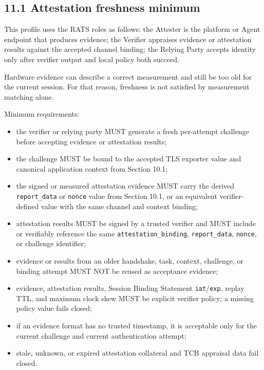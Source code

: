\documentclass[
]{article}
\providecommand{\tightlist}{%
  \setlength{\itemsep}{0pt}\setlength{\parskip}{0pt}}
\begin{document}
\subsection{11.1 Attestation freshness
minimum}\label{attestation-freshness-minimum}

This profile uses the RATS roles as follows: the Attester is the
platform or Agent endpoint that produces evidence; the Verifier appraises
evidence or attestation results against the accepted channel binding; the
Relying Party accepts identity only after verifier output and local
policy both succeed.

Hardware evidence can describe a correct measurement and still be too
old for the current session. For that reason, freshness is not satisfied
by measurement matching alone.

Minimum requirements:

\begin{itemize}
\tightlist
\item
  the verifier or relying party MUST generate a fresh per-attempt
  challenge before accepting evidence or attestation results;
\item
  the challenge MUST be bound to the accepted TLS exporter value and
  canonical application context from Section 10.1;
\item
  the signed or measured attestation evidence MUST carry the derived
  \texttt{report\_data} or \texttt{nonce} value from Section 10.1, or an
  equivalent verifier-defined value with the same channel and context
  binding;
\item
  attestation results MUST be signed by a trusted verifier and MUST
  include or verifiably reference the same
  \texttt{attestation\_binding}, \texttt{report\_data}, \texttt{nonce},
  or challenge identifier;
\item
  evidence or results from an older handshake, task, context, challenge,
  or binding attempt MUST NOT be reused as acceptance evidence;
\item
  evidence, attestation results, Session Binding Statement
  \texttt{iat}/\texttt{exp}, replay TTL, and maximum clock skew MUST be
  explicit verifier policy; a missing policy value fails closed;
\item
  if an evidence format has no trusted timestamp, it is acceptable only
  for the current challenge and current authentication attempt;
\item
  stale, unknown, or expired attestation collateral and TCB appraisal
  data fail closed.
\end{itemize}
\end{document}
